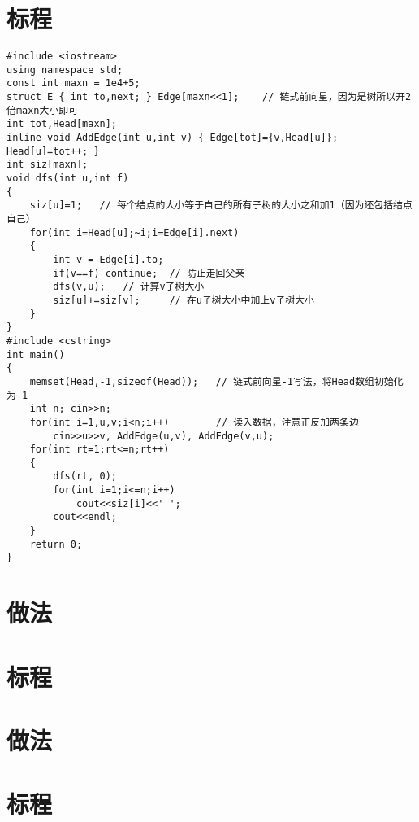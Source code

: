 \documentclass{ctsol}
\begin{document}
\section*{标程}
\begin{lstlisting}
#include <iostream>
using namespace std;
const int maxn = 1e4+5;
struct E { int to,next; } Edge[maxn<<1];    // 链式前向星，因为是树所以开2倍maxn大小即可
int tot,Head[maxn];
inline void AddEdge(int u,int v) { Edge[tot]={v,Head[u]}; Head[u]=tot++; }
int siz[maxn];
void dfs(int u,int f)
{
    siz[u]=1;   // 每个结点的大小等于自己的所有子树的大小之和加1（因为还包括结点自己）
    for(int i=Head[u];~i;i=Edge[i].next)
    {
        int v = Edge[i].to;
        if(v==f) continue;  // 防止走回父亲
        dfs(v,u);   // 计算v子树大小
        siz[u]+=siz[v];     // 在u子树大小中加上v子树大小
    }
}
#include <cstring>
int main()
{
    memset(Head,-1,sizeof(Head));   // 链式前向星-1写法，将Head数组初始化为-1
    int n; cin>>n;
    for(int i=1,u,v;i<n;i++)        // 读入数据，注意正反加两条边
        cin>>u>>v, AddEdge(u,v), AddEdge(v,u);
    for(int rt=1;rt<=n;rt++)
    {
        dfs(rt, 0);
        for(int i=1;i<=n;i++)
            cout<<siz[i]<<' ';
        cout<<endl;
    }
    return 0;
}
\end{lstlisting}

\makesolution
\section*{做法}
\section*{标程}

\makesolution
\section*{做法}
\section*{标程}
\end{document}
